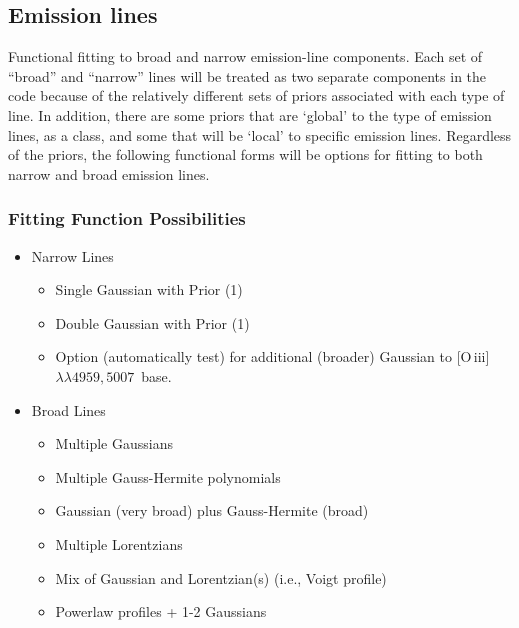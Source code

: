\documentclass[12pt,letterpaper]{article}
\newcommand{\ob}{[O\,{\sc iii}]\,$\lambda \lambda 4959,5007$}
\begin{document}
\subsection*{Emission lines}
Functional fitting to broad and narrow emission-line components.  Each
set of ``broad'' and ``narrow'' lines will be treated as two separate
components in the code because of the relatively different sets of
priors associated with each type of line.  In addition, there are some
priors that are `global' to the type of emission lines, as a class, and
some that will be `local' to specific emission lines. Regardless of the
priors, the following functional forms will be options for fitting to
both narrow and broad emission lines.

\subsubsection*{Fitting Function Possibilities}

  \begin{itemize}
    \item Narrow Lines
      \begin{itemize}
        \item Single Gaussian with Prior (1) 
	\item Double Gaussian with Prior (1)  
        \item Option (automatically test) for additional (broader) Gaussian to \ob\ base. 
      \end{itemize}
    \item Broad Lines
      \begin{itemize}
        \item Multiple Gaussians
        \item Multiple Gauss-Hermite polynomials
        \item Gaussian (very broad) plus Gauss-Hermite (broad)
        \item Multiple Lorentzians
        \item Mix of Gaussian and Lorentzian(s) (i.e., Voigt profile)
	\item Powerlaw profiles + 1-2 Gaussians 
      \end{itemize}
   \end{itemize}
\end{document}
